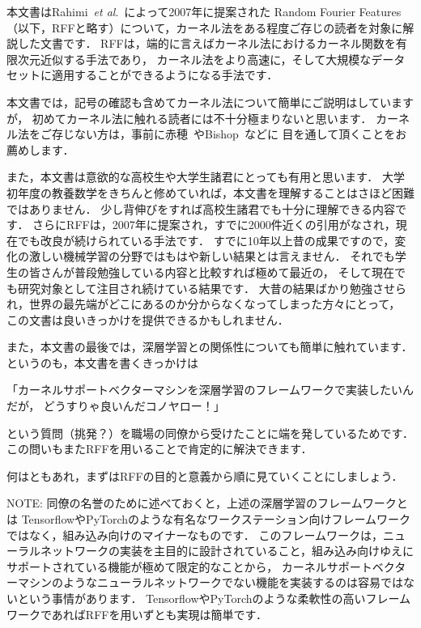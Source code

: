 %

本文書はRahimi~\textit{et al}.~\cite{Rahimi2007}によって2007年に提案された
Random Fourier Features（以下，RFFと略す）について，カーネル法をある程度ご存じの読者を対象に解説した文書です．
RFFは，端的に言えばカーネル法におけるカーネル関数を有限次元近似する手法であり，
カーネル法をより高速に，そして大規模なデータセットに適用することができるようになる手法です．

本文書では，記号の確認も含めてカーネル法について簡単にご説明はしていますが，
初めてカーネル法に触れる読者には不十分極まりないと思います．
カーネル法をご存じない方は，事前に赤穂~\cite{Akaho2008}やBishop~\cite{Bishop2010}などに
目を通して頂くことをお薦めします．

また，本文書は意欲的な高校生や大学生諸君にとっても有用と思います．
大学初年度の教養数学をきちんと修めていれば，本文書を理解することはさほど困難ではありません．
少し背伸びをすれば高校生諸君でも十分に理解できる内容です．
さらにRFFは，2007年に提案され，すでに2000件近くの引用がなされ，現在でも改良が続けられている手法です．
すでに10年以上昔の成果ですので，変化の激しい機械学習の分野ではもはや新しい結果とは言えません．
それでも学生の皆さんが普段勉強している内容と比較すれば極めて最近の，
そして現在でも研究対象として注目され続けている結果です．
大昔の結果ばかり勉強させられ，世界の最先端がどこにあるのか分からなくなってしまった方々にとって，
この文書は良いきっかけを提供できるかもしれません．

また，本文書の最後では，深層学習との関係性についても簡単に触れています．
というのも，本文書を書くきっかけは
\begin{center}
「カーネルサポートベクターマシンを深層学習のフレームワークで実装したいんだが，
どうすりゃ良いんだコノヤロー！」
\end{center}
という質問（挑発？）を職場の同僚から受けたことに端を発しているためです．
この問いもまたRFFを用いることで肯定的に解決できます．

何はともあれ，まずはRFFの目的と意義から順に見ていくことにしましょう．

\begin{displayquote}\footnotesize\textsf{NOTE:}
同僚の名誉のために述べておくと，上述の深層学習のフレームワークとは
TensorflowやPyTorchのような有名なワークステーション向けフレームワークではなく，組み込み向けのマイナーなものです．
このフレームワークは，ニューラルネットワークの実装を主目的に設計されていること，組み込み向けゆえにサポートされている機能が極めて限定的なことから，
カーネルサポートベクターマシンのようなニューラルネットワークでない機能を実装するのは容易ではないという事情があります．
TensorflowやPyTorchのような柔軟性の高いフレームワークであればRFFを用いずとも実現は簡単です．
\end{displayquote}

